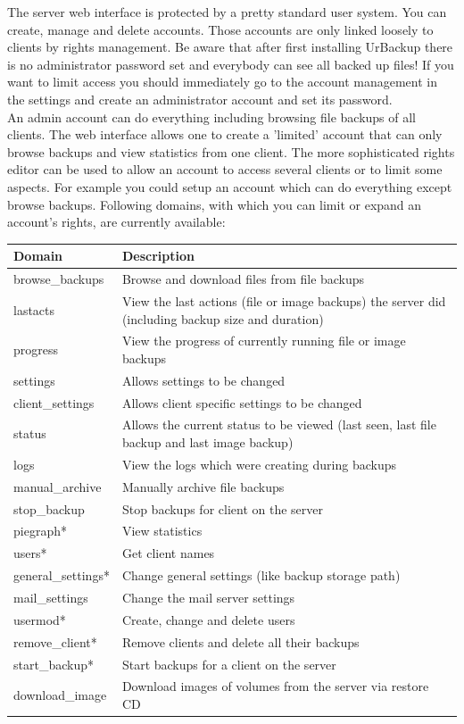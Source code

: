 \documentclass[a4paper,10pt]{article}
\begin{document}
The server web interface is protected by a pretty standard user system. You can
create, manage and delete accounts. Those accounts are only linked loosely to
clients by rights management. Be aware that after first installing UrBackup
there is no administrator password set and everybody can see all backed up files!
If you want to limit access you should immediately go to the account management
in the settings and create an administrator account and set its password.\\
An admin account can do everything including browsing file backups of all
clients. The web interface allows one to create a 'limited' account that can only
browse backups and view statistics from one client. The more sophisticated
rights editor can be used to allow an account to access several clients or to
limit some aspects. For example you could setup an account which can do
everything except browse backups.
Following domains, with which you can limit or expand an account's rights, are
currently available:

\begin{tabular}{|l|p{}|}
\hline
Domain  & Description \\
\hline\hline
browse\_backups & Browse and download files from file backups\\
lastacts & View the last actions (file or image backups) the server did (including backup size and duration)\\
progress & View the progress of currently running file or image backups\\
settings & Allows settings to be changed \\
client\_settings & Allows client specific settings to be changed \\
status & Allows the current status to be viewed (last seen, last file backup and last image backup)\\
logs & View the logs which were creating during backups\\
manual\_archive & Manually archive file backups\\
stop\_backup & Stop backups for client on the server\\
piegraph* & View statistics\\
users* & Get client names\\
general\_settings* & Change general settings (like backup storage path)\\
mail\_settings & Change the mail server settings \\
usermod* & Create, change and delete users\\
remove\_client* & Remove clients and delete all their backups\\
start\_backup* & Start backups for a client on the server\\
download\_image & Download images of volumes from the server via restore CD\\

\hline
\end{tabular}
\end{document}
